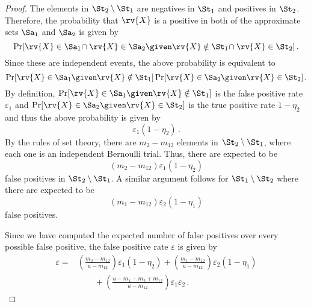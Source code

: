 \documentclass[ ../main.tex]{subfiles}
\begin{document}
\begin{proof}
The elements in $\St_2 \setminus \St_1$ are negatives in $\St_1$ and positives in $\St_2$. Therefore, the probability that $\rv{X}$ is a positive in both of the approximate sets $\Sa_1$ and $\Sa_2$ is given by
\begin{equation}
    \Pr[\rv{X} \in \Sa_1 \! \cap \rv{X} \in \Sa_2 \given \rv{X} \notin \St_1 \! \cap \rv{X} \in \St_2]\,.
\end{equation}
Since these are independent events, the above probability is equivalent to
\begin{equation}
    \Pr[\rv{X} \in \Sa_1 \given \rv{X} \notin \St_1] \Pr[\rv{X} \in \Sa_2 \given \rv{X} \in \St_2]\,.
\end{equation}
By definition, $\Pr[\rv{X} \in \Sa_1 \given \rv{X} \notin \St_1]$ is the false positive rate $\varepsilon_1$ and $\Pr[\rv{X} \in \Sa_2 \given \rv{X} \in \St_2]$ is the true positive rate $1 - \eta_2$ and thus the above probability is given by
\begin{equation}
    \varepsilon_1 (1 - \eta_2)\,.
\end{equation}
By the rules of set theory, there are $m_2 - m_{1 2}$ elements in $\St_2 \setminus \St_1$, where each one is an independent Bernoulli trial. Thus, there are expected to be
\begin{equation}
    (m_2 - m_{1 2}) \varepsilon_1 (1 - \eta_2)
\end{equation}
false positives in $\St_2 \setminus \St_1$. A similar argument follows for $\St_1 \setminus \St_2$ where there are expected to be
\begin{equation}
    (m_1 - m_{1 2}) \varepsilon_2 (1 - \eta_1) 
\end{equation}
false positives.

Since we have computed the expected number of false positives over every possible false positive, the false positive rate $\varepsilon$ is given by
\begin{equation}
\begin{split}
    \varepsilon =
        & \left(\frac{m_2 - m_{1 2}}{u - m_{1 2}}\right) \varepsilon_1 \left(1 - \eta_2\right) + \left(\frac{m_1 - m_{1 2}}{u - m_{1 2}}\right) \varepsilon_2 \left(1 - \eta_1\right)\\
        &\qquad+ \left(\frac{u - m_1 - m_2 + m_{1 2}}{u - m_{1 2}}\right) \varepsilon_1 \varepsilon_2\,.
\end{split}
\end{equation}
\end{proof}
\end{document}
